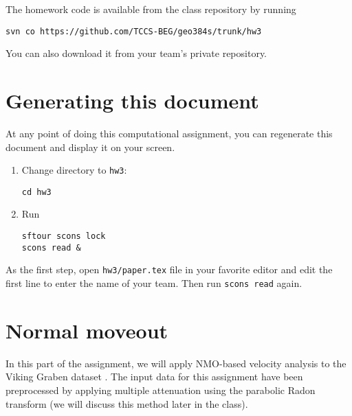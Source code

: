 The homework code is available from the class repository
by running
\begin{verbatim}
svn co https://github.com/TCCS-BEG/geo384s/trunk/hw3
\end{verbatim}
You can also download it from your team's private repository.

\section{Generating this document}

At any point of doing this computational assignment, you can
regenerate this document and display it on your screen.

\begin{enumerate}          
\item Change directory to \texttt{hw3}:
\begin{verbatim}
cd hw3
\end{verbatim}
\item Run
\begin{verbatim}
sftour scons lock
scons read &
\end{verbatim}
\end{enumerate}

As the first step, open \texttt{hw3/paper.tex} file in your favorite
editor and edit the first line to enter the name of your team. Then
run \texttt{scons read} again.

\section{Normal moveout}

In this part of the assignment, we will apply NMO-based velocity
analysis to the Viking Graben dataset \cite[]{CSI00-00-00010213}. The input data for this
assignment have been preprocessed by applying multiple attenuation
using the parabolic Radon transform (we will discuss this method later
in the class).

